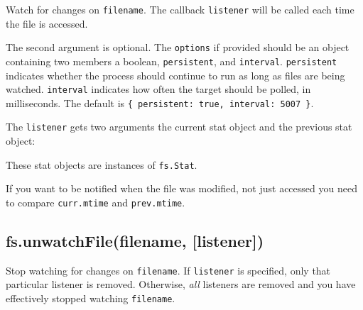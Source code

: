 Watch for changes on \texttt{filename}. The callback \texttt{listener}
will be called each time the file is accessed.

The second argument is optional. The \texttt{options} if provided should
be an object containing two members a boolean, \texttt{persistent}, and
\texttt{interval}. \texttt{persistent} indicates whether the process
should continue to run as long as files are being watched.
\texttt{interval} indicates how often the target should be polled, in
milliseconds. The default is
\texttt{\{ persistent: true, interval: 5007 \}}.

The \texttt{listener} gets two arguments the current stat object and the
previous stat object:

\begin{Shaded}
\begin{Highlighting}[]
\NormalTok{(}\NormalTok{, } 
  \NormalTok{(} \NormalTok{+ }\NormalTok{);}
  \NormalTok{(} \NormalTok{+ }\NormalTok{);}
\NormalTok{\});}
\end{Highlighting}
\end{Shaded}

These stat objects are instances of \texttt{fs.Stat}.

If you want to be notified when the file was modified, not just accessed
you need to compare \texttt{curr.mtime} and \texttt{prev.mtime}.

\subsection{fs.unwatchFile(filename, {[}listener{]})}

\begin{Shaded}
\begin{Highlighting}[]
\NormalTok{: } \NormalTok{- }  
\end{Highlighting}
\end{Shaded}

Stop watching for changes on \texttt{filename}. If \texttt{listener} is
specified, only that particular listener is removed. Otherwise,
\emph{all} listeners are removed and you have effectively stopped
watching \texttt{filename}.

